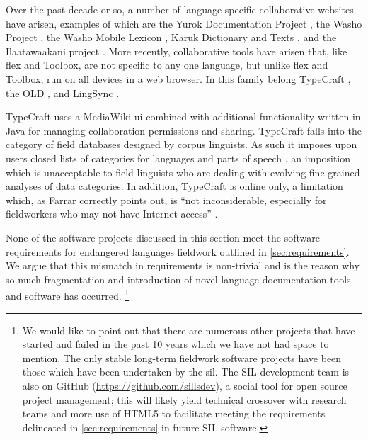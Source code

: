 \documentclass[11pt]{article}
\begin{document}

Over the past decade or so, a number of language-specific collaborative
websites have arisen, examples of which are the Yurok Documentation Project
\cite{Yurok:2001:Online}, the Washo Project
\cite{Washo:2005:Online,Cihlar:2008}, the Washo Mobile Lexicon
\cite{WashoMobile:2008:Online}, Karuk Dictionary and Texts
\cite{Karuk:2009:Online}, and the Ilaatawaakani project \cite{Troy:2014}. More
recently, collaborative  tools have arisen that, like \gls{flex} and Toolbox, are not
specific to any one language, but unlike \gls{flex} and Toolbox, run on all devices
in a web browser.  In this family belong TypeCraft \cite{Beermann:2012}, the
OLD \cite{dunham2014docs}, and LingSync \cite{lingsync:2012}.

TypeCraft uses a MediaWiki \gls{ui} combined with additional functionality
written in Java for managing collaboration permissions and sharing. TypeCraft
falls into the category of field databases designed by corpus linguists. As
such it imposes upon users closed lists of categories for languages and parts
of speech \cite{Farrar:2010}, an imposition which is unacceptable to field
linguists who are dealing with evolving fine-grained analyses of data
categories. In addition, TypeCraft is online only, a limitation which, as
Farrar correctly points out, is ``not inconsiderable, especially for
fieldworkers who may not have Internet access'' \cite{Farrar:2010}.

None of the software projects discussed in this section meet the software
requirements for endangered languages fieldwork outlined in
\autoref{sec:requirements}. We argue that this mismatch in requirements is
non-trivial and is the reason why so much fragmentation and introduction of novel
language documentation tools and software has occurred.%
\footnote{We would like to point out that there are numerous other projects
    that have started and failed in the past 10 years which we have not had
    space to mention. The only stable long-term fieldwork software projects
    have been those which have been undertaken by the \gls{sil}. The SIL
    development team is also on GitHub (\url{https://github.com/sillsdev}), a
    social tool for open source project management; this will likely yield
    technical crossover with research teams and more use of HTML5 to facilitate
    meeting the requirements delineated in \autoref{sec:requirements} in future
SIL software.} %
\end{document}
